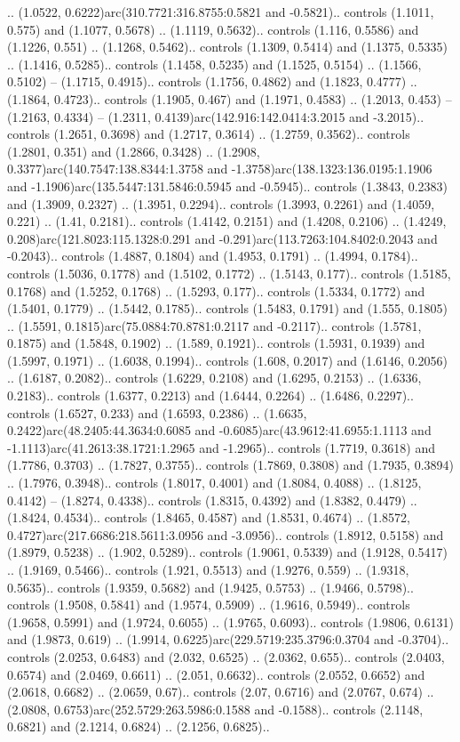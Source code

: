 .. (1.0522, 0.6222)arc(310.7721:316.8755:0.5821 and -0.5821).. controls (1.1011, 0.575) and (1.1077, 0.5678) .. (1.1119, 0.5632).. controls (1.116, 0.5586) and (1.1226, 0.551) .. (1.1268, 0.5462).. controls (1.1309, 0.5414) and (1.1375, 0.5335) .. (1.1416, 0.5285).. controls (1.1458, 0.5235) and (1.1525, 0.5154) .. (1.1566, 0.5102) -- (1.1715, 0.4915).. controls (1.1756, 0.4862) and (1.1823, 0.4777) .. (1.1864, 0.4723).. controls (1.1905, 0.467) and (1.1971, 0.4583) .. (1.2013, 0.453) -- (1.2163, 0.4334) -- (1.2311, 0.4139)arc(142.916:142.0414:3.2015 and -3.2015).. controls (1.2651, 0.3698) and (1.2717, 0.3614) .. (1.2759, 0.3562).. controls (1.2801, 0.351) and (1.2866, 0.3428) .. (1.2908, 0.3377)arc(140.7547:138.8344:1.3758 and -1.3758)arc(138.1323:136.0195:1.1906 and -1.1906)arc(135.5447:131.5846:0.5945 and -0.5945).. controls (1.3843, 0.2383) and (1.3909, 0.2327) .. (1.3951, 0.2294).. controls (1.3993, 0.2261) and (1.4059, 0.221) .. (1.41, 0.2181).. controls (1.4142, 0.2151) and (1.4208, 0.2106) .. (1.4249, 0.208)arc(121.8023:115.1328:0.291 and -0.291)arc(113.7263:104.8402:0.2043 and -0.2043).. controls (1.4887, 0.1804) and (1.4953, 0.1791) .. (1.4994, 0.1784).. controls (1.5036, 0.1778) and (1.5102, 0.1772) .. (1.5143, 0.177).. controls (1.5185, 0.1768) and (1.5252, 0.1768) .. (1.5293, 0.177).. controls (1.5334, 0.1772) and (1.5401, 0.1779) .. (1.5442, 0.1785).. controls (1.5483, 0.1791) and (1.555, 0.1805) .. (1.5591, 0.1815)arc(75.0884:70.8781:0.2117 and -0.2117).. controls (1.5781, 0.1875) and (1.5848, 0.1902) .. (1.589, 0.1921).. controls (1.5931, 0.1939) and (1.5997, 0.1971) .. (1.6038, 0.1994).. controls (1.608, 0.2017) and (1.6146, 0.2056) .. (1.6187, 0.2082).. controls (1.6229, 0.2108) and (1.6295, 0.2153) .. (1.6336, 0.2183).. controls (1.6377, 0.2213) and (1.6444, 0.2264) .. (1.6486, 0.2297).. controls (1.6527, 0.233) and (1.6593, 0.2386) .. (1.6635, 0.2422)arc(48.2405:44.3634:0.6085 and -0.6085)arc(43.9612:41.6955:1.1113 and -1.1113)arc(41.2613:38.1721:1.2965 and -1.2965).. controls (1.7719, 0.3618) and (1.7786, 0.3703) .. (1.7827, 0.3755).. controls (1.7869, 0.3808) and (1.7935, 0.3894) .. (1.7976, 0.3948).. controls (1.8017, 0.4001) and (1.8084, 0.4088) .. (1.8125, 0.4142) -- (1.8274, 0.4338).. controls (1.8315, 0.4392) and (1.8382, 0.4479) .. (1.8424, 0.4534).. controls (1.8465, 0.4587) and (1.8531, 0.4674) .. (1.8572, 0.4727)arc(217.6686:218.5611:3.0956 and -3.0956).. controls (1.8912, 0.5158) and (1.8979, 0.5238) .. (1.902, 0.5289).. controls (1.9061, 0.5339) and (1.9128, 0.5417) .. (1.9169, 0.5466).. controls (1.921, 0.5513) and (1.9276, 0.559) .. (1.9318, 0.5635).. controls (1.9359, 0.5682) and (1.9425, 0.5753) .. (1.9466, 0.5798).. controls (1.9508, 0.5841) and (1.9574, 0.5909) .. (1.9616, 0.5949).. controls (1.9658, 0.5991) and (1.9724, 0.6055) .. (1.9765, 0.6093).. controls (1.9806, 0.6131) and (1.9873, 0.619) .. (1.9914, 0.6225)arc(229.5719:235.3796:0.3704 and -0.3704).. controls (2.0253, 0.6483) and (2.032, 0.6525) .. (2.0362, 0.655).. controls (2.0403, 0.6574) and (2.0469, 0.6611) .. (2.051, 0.6632).. controls (2.0552, 0.6652) and (2.0618, 0.6682) .. (2.0659, 0.67).. controls (2.07, 0.6716) and (2.0767, 0.674) .. (2.0808, 0.6753)arc(252.5729:263.5986:0.1588 and -0.1588).. controls (2.1148, 0.6821) and (2.1214, 0.6824) .. (2.1256, 0.6825).. 
